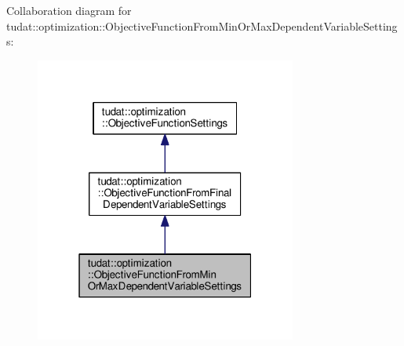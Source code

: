 Collaboration diagram for tudat\+:\+:optimization\+:\+:Objective\+Function\+From\+Min\+Or\+Max\+Dependent\+Variable\+Settings\+:
\nopagebreak
\begin{figure}[H]
\begin{center}
\leavevmode
\includegraphics[width=244pt]{structtudat_1_1optimization_1_1ObjectiveFunctionFromMinOrMaxDependentVariableSettings__coll__graph}
\end{center}
\end{figure}
